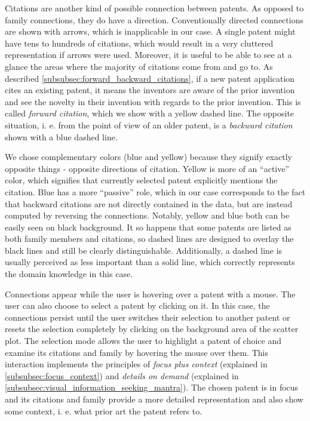 Citations are another kind of possible connection between patents.
As opposed to family connections, they do have a direction.
Conventionally directed connections are shown with arrows, which is inapplicable in our case.
A single patent might have tens to hundreds of citations, which would result in a very cluttered representation if arrows were used.
Moreover, it is useful to be able to see at a glance the areas where the majority of citations come from and go to.
As described \autoref{subsubsec:forward_backward_citations}, if a new patent application cites an existing patent, it means the inventors are aware of the prior invention and see the novelty in their invention with regards to the prior invention.
This is called \textit{forward citation}, which we show with a yellow dashed line.
The opposite situation, i. e. from the point of view of an older patent, is a \textit{backward citation} shown with a blue dashed line.

We chose complementary colors (blue and yellow) because they signify exactly opposite things - opposite directions of citation.
Yellow is more of an ``active'' color, which signifies that currently selected patent explicitly mentions the citation.
Blue has a more ``passive'' role, which in our case corresponds to the fact that backward citations are not directly contained in the data, but are instead computed by reversing the connections.
Notably, yellow and blue both can be easily seen on black background.
It so happens that some patents are listed as both family members and citations, so dashed lines are designed to overlay the black lines and still be clearly distinguishable.
Additionally, a dashed line is usually perceived as less important than a solid line, which correctly represents the domain knowledge in this case.

Connections appear while the user is hovering over a patent with a mouse.
The user can also choose to select a patent by clicking on it.
In this case, the connections persist until the user switches their selection to another patent or resets the selection completely by clicking on the background area of the scatter plot.
The selection mode allows the user to highlight a patent of choice and examine its citations and family by hovering the mouse over them.
This interaction implements the principles of \textit{focus plus context} (explained in \autoref{subsubsec:focus_context}) and \textit{details on demand} (explained in \autoref{subsubsec:visual_information_seeking_mantra}).
The chosen patent is in focus and its citations and family provide a more detailed representation and also show some context, i. e. what prior art the patent refers to.

